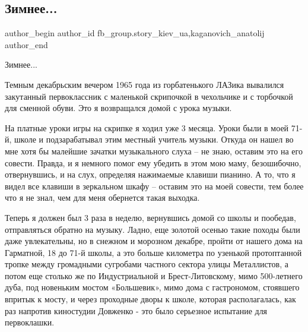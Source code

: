  
 
 
 
 
 
\subsection{Зимнее...}
\label{sec:30_12_2021.fb.fb_group.story_kiev_ua.3.zimnee_a}
 
\ifcmt
 author_begin
   author_id fb_group.story_kiev_ua,kaganovich_anatolij
 author_end
\fi

Зимнее...


Темным декабрьским вечером 1965 года из горбатенького ЛАЗика вывалился
закутанный первоклассник с маленькой скрипочкой в чехольчике и с торбочкой для
сменной обуви. Это я возвращался домой с урока музыки.

На платные уроки игры на скрипке я ходил уже 3 месяца. Уроки были в моей 71-й,
школе и подзарабатывал этим местный учитель музыки. Откуда он нашел во мне хотя
бы малейшие зачатки музыкального слуха – не знаю, оставим это на его совести.
Правда, и я немного помог ему убедить в этом мою маму, безошибочно,
отвернувшись, и на слух, определяя нажимаемые клавиши пианино. А то, что я
видел все клавиши в зеркальном шкафу – оставим это на моей совести, тем более
что я не знал, чем для меня обернется такая выходка.


Теперь я должен был 3 раза в неделю, вернувшись домой со школы и пообедав,
отправляться обратно на музыку. Ладно, еще золотой осенью такие походы были
даже увлекательны, но в снежном и морозном декабре, пройти от нашего дома на
Гарматной, 18 до 71-й школы, а это больше километра по узенькой протоптанной
тропке между громадными сугробами частного сектора улицы Металлистов, а потом
еще столько же по Индустриальной и Брест-Литовскому, мимо 500-летнего дуба, под
новеньким мостом «Большевик», мимо дома с гастрономом, стоявшего впритык к
мосту, и через проходные дворы к школе, которая располагалась, как раз напротив
киностудии Довженко - это было серьезное испытание для первоклашки.

